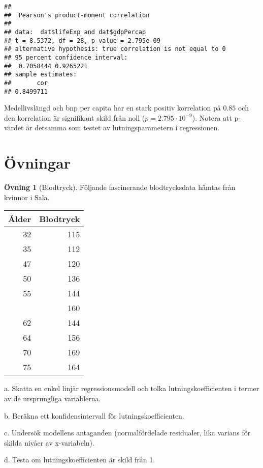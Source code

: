 \documentclass[
]{book}
\newenvironment{Shaded}{\begin{snugshade}}{\end{snugshade}}
\newcommand{\FunctionTok}[1]{\textcolor[rgb]{0.00,0.00,0.00}{#1}}
\newcommand{\NormalTok}[1]{#1}
\newcommand{\SpecialCharTok}[1]{\textcolor[rgb]{0.00,0.00,0.00}{#1}}
\theoremstyle{definition}
\theoremstyle{definition}
\theoremstyle{definition}
\newtheorem{exercise}{Övning}[chapter]
\theoremstyle{definition}
\theoremstyle{remark}
\begin{document}
\begin{Shaded}
\end{Shaded}

\begin{verbatim}
## 
##  Pearson's product-moment correlation
## 
## data:  dat$lifeExp and dat$gdpPercap
## t = 8.5372, df = 28, p-value = 2.795e-09
## alternative hypothesis: true correlation is not equal to 0
## 95 percent confidence interval:
##  0.7058444 0.9265221
## sample estimates:
##       cor 
## 0.8499711
\end{verbatim}

Medellivslängd och bnp per capita har en stark positiv korrelation på \(0.85\) och den korrelation är signifikant skild från noll (\(p = 2.795 \cdot 10^{-9}\)). Notera att p-värdet är detsamma som testet av lutningsparametern i regressionen.

\hypertarget{uxf6vningar-5}{%
\section{Övningar}\label{uxf6vningar-5}}

\begin{exercise}[Blodtryck]
Följande fascinerande blodtrycksdata hämtas från kvinnor i Sala.

\begin{table}
\centering
\begin{tabular}[t]{rr}
\toprule
Ålder & Blodtryck\\
\midrule
32 & 115\\
35 & 112\\
47 & 120\\
50 & 136\\
55 & 144\\
\addlinespace
60 & 160\\
62 & 144\\
64 & 156\\
70 & 169\\
75 & 164\\
\bottomrule
\end{tabular}
\end{table}

a. Skatta en enkel linjär regressionsmodell och tolka lutningskoefficienten i termer av de ursprungliga variablerna.

b. Beräkna ett konfidensintervall för lutningskoefficienten.

c. Undersök modellens antaganden (normalfördelade residualer, lika varians för skilda nivåer av x-variabeln).

d. Testa om lutningskoefficienten är skild från 1.
\end{exercise}
\end{document}
